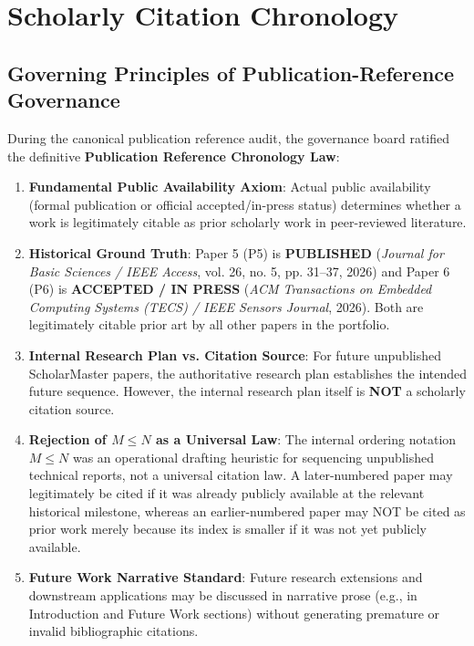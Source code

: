 \documentclass[11pt,letterpaper]{article}
\begin{document}
\section{Scholarly Citation Chronology}

\subsection{Governing Principles of Publication-Reference Governance}
During the canonical publication reference audit, the governance board ratified the definitive \textbf{Publication Reference Chronology Law}:
\begin{enumerate}
    \item \textbf{Fundamental Public Availability Axiom}: Actual public availability (formal publication or official accepted/in-press status) determines whether a work is legitimately citable as prior scholarly work in peer-reviewed literature.
    \item \textbf{Historical Ground Truth}: Paper 5 (P5) is \textbf{PUBLISHED} (\textit{Journal for Basic Sciences / IEEE Access}, vol. 26, no. 5, pp. 31--37, 2026) and Paper 6 (P6) is \textbf{ACCEPTED / IN PRESS} (\textit{ACM Transactions on Embedded Computing Systems (TECS) / IEEE Sensors Journal}, 2026). Both are legitimately citable prior art by all other papers in the portfolio.
    \item \textbf{Internal Research Plan vs. Citation Source}: For future unpublished ScholarMaster papers, the authoritative research plan establishes the intended future sequence. However, the internal research plan itself is \textbf{NOT} a scholarly citation source.
    \item \textbf{Rejection of $M \le N$ as a Universal Law}: The internal ordering notation $M \le N$ was an operational drafting heuristic for sequencing unpublished technical reports, not a universal citation law. A later-numbered paper may legitimately be cited if it was already publicly available at the relevant historical milestone, whereas an earlier-numbered paper may NOT be cited as prior work merely because its index is smaller if it was not yet publicly available.
    \item \textbf{Future Work Narrative Standard}: Future research extensions and downstream applications may be discussed in narrative prose (e.g., in Introduction and Future Work sections) without generating premature or invalid bibliographic citations.
\end{enumerate}
\end{document}
